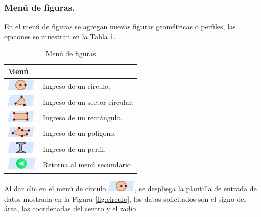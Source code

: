 \documentclass[spanish,xcolor=pdftex,dvipsnames,table,mathserif]{scrartcl}
\begin{document}
\subsubsection{Menú de figuras.}
En el menú de figuras se agregan nuevas figuras geométricas o perfiles, las opciones  se muestran en la Tabla \ref{tab:menuFiguras}.
\begin{table}[H]
	\caption{Menú de figuras}
	\label{tab:menuFiguras}
	\begin{tabular}{>{\centering}m{2cm}>{\raggedright}m{14cm}}
		\toprule 
		\textbf{Menú} & \multicolumn{1}{c}{\textbf{Descripción}} \tabularnewline
		\midrule 
		\includegraphics{imagenes/men_circulo}
		& Ingreso de un circulo.\tabularnewline
		\cmidrule(lr){1-2}
		\includegraphics{imagenes/men_sector} &Ingreso de un sector circular. \tabularnewline
		\cmidrule(lr){1-2}
		\includegraphics{imagenes/men_rectangulo}&Ingreso de un rectángulo. \tabularnewline
		\cmidrule(lr){1-2}
		\includegraphics{imagenes/men_poligono}&Ingreso de un polígono. \tabularnewline
		\cmidrule(lr){1-2}
		\includegraphics{imagenes/men_perfil}& Ingreso de un perfil.\tabularnewline
		\cmidrule(lr){1-2}
		\includegraphics{imagenes/men_volver}& Retorna al menú secundario \tabularnewline
		\bottomrule
	\end{tabular}
\end{table}
Al dar clic en el menú de círculo \includegraphics{imagenes/men_circulo}, se despliega la plantilla de entrada de datos mostrada en la Figura \ref{fig:circulo}, los datos solicitados son el signo del área, las coordenadas del centro y el radio.
\end{document}
